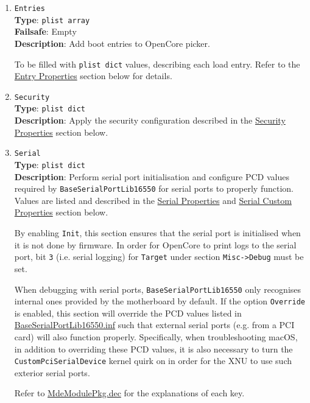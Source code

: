 \documentclass[]{article}
\begin{document}
\begin{enumerate}
\item
  \texttt{Entries}\\
  \textbf{Type}: \texttt{plist\ array}\\
  \textbf{Failsafe}: Empty\\
  \textbf{Description}: Add boot entries to OpenCore picker.

  To be filled with \texttt{plist\ dict} values, describing each load entry.
  Refer to the \hyperref[miscentryprops]{Entry Properties} section below for details.

\item
  \texttt{Security}\\
  \textbf{Type}: \texttt{plist\ dict}\\
  \textbf{Description}: Apply the security configuration described in the
  \hyperref[miscsecurityprops]{Security Properties} section below.

\item
  \texttt{Serial}\\
  \textbf{Type}: \texttt{plist\ dict}\\
  \textbf{Description}: Perform serial port initialisation and
  configure PCD values required by \texttt{BaseSerialPortLib16550} for serial ports to properly function.
  Values are listed and described in the \hyperref[miscserialprops]{Serial Properties} and \hyperref[miscserialcustprops]{Serial Custom Properties} section below.

  By enabling \texttt{Init}, this section ensures that the serial port is initialised when it is not done by firmware.
  In order for OpenCore to print logs to the serial port, bit \texttt{3} (i.e. serial logging) for \texttt{Target}
  under section \texttt{Misc->Debug} must be set.

  When debugging with serial ports, \texttt{BaseSerialPortLib16550} only recognises internal ones
  provided by the motherboard by default. If the option \texttt{Override} is enabled, this section will override the PCD values listed in
  \href{https://github.com/acidanthera/audk/blob/master/MdeModulePkg/Library/BaseSerialPortLib16550/BaseSerialPortLib16550.inf}{BaseSerialPortLib16550.inf}
  such that external serial ports (e.g. from a PCI card) will also function properly. Specifically, when troubleshooting macOS,
  in addition to overriding these PCD values, it is also necessary to turn the \texttt{CustomPciSerialDevice} kernel quirk on in order for
  the XNU to use such exterior serial ports.


  Refer to \href{https://github.com/acidanthera/audk/blob/master/MdeModulePkg/MdeModulePkg.dec}{MdeModulePkg.dec} for the explanations of each key.


\end{enumerate}
\end{document}

